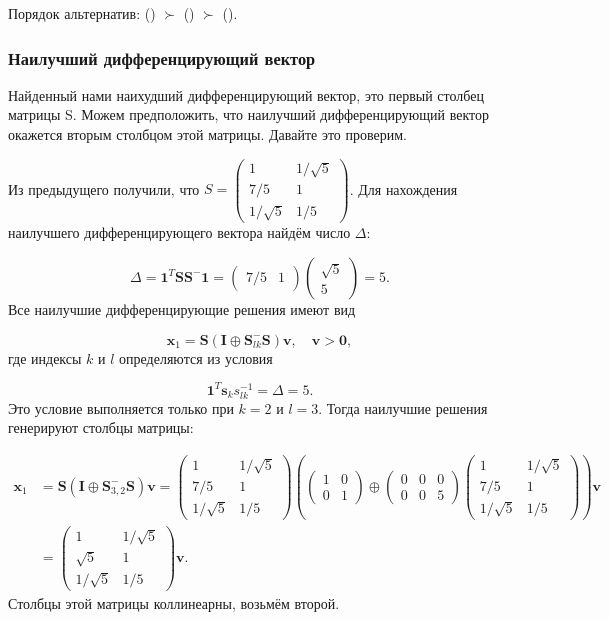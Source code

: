 \documentclass[specialist,
  substylefile = spbu.rtx,
  href,
  colorlinks=true,
  12pt]{disser}
\begin{document}
	Порядок альтернатив: () \(\succ\) () \(\succ\) ().
	\subsubsection{Наилучший дифференцирующий вектор}
	\label{sec:org896b7a9}
	Найденный нами наихудший дифференцирующий вектор, это первый столбец матрицы S. Можем предположить, что наилучший дифференцирующий вектор окажется вторым столбцом этой матрицы. Давайте это проверим.
	
	Из предыдущего получили, что \(S = \begin{pmatrix}1&1/\sqrt{5}\\7/5&1\\1/\sqrt{5}&1/5\end{pmatrix}\).
	Для нахождения наилучшего дифференцирующего вектора найдём число \(\Delta\):
	
	\[
	\Delta = \mathbf{1}^{T} \boldsymbol{S} \boldsymbol{S}^{-} \mathbf{1} = \begin{pmatrix}7/5&1\end{pmatrix}\begin{pmatrix}\sqrt{5}\\5\end{pmatrix} = 5.
	\]
	Все наилучшие дифференцирующие решения имеют вид
	
	\[
	\boldsymbol{x}_{1}=\boldsymbol{S}\left(\boldsymbol{I} \oplus \boldsymbol{S}_{l k}^{-} \boldsymbol{S}\right) \boldsymbol{v}, \quad \boldsymbol{v}>\mathbf{0},
	\]
	где индексы \(k\) и \(l\) определяются из условия
	
	\[
	\mathbf{1}^{T} \boldsymbol{s}_{k} s_{l k}^{-1}=\Delta = 5.
	\]
	Это условие выполняется только при \(k=2\) и \(l=3\). Тогда наилучшие решения генерируют столбцы матрицы:
	
	\begin{align*}
		\boldsymbol{x}_{1}&=\boldsymbol{S}\left(\boldsymbol{I} \oplus \boldsymbol{S}_{3,2}^{-} \boldsymbol{S}\right) \boldsymbol{v} = \begin{pmatrix}1&1/\sqrt{5}\\7/5&1\\1/\sqrt{5}&1/5\end{pmatrix} \left( \begin{pmatrix}1&0\\0&1\end{pmatrix} \oplus \begin{pmatrix}0&0&0\\0&0&5\end{pmatrix}\begin{pmatrix}1&1/\sqrt{5}\\7/5&1\\1/\sqrt{5}&1/5\end{pmatrix} \right)\boldsymbol{v} \\
		&= \begin{pmatrix}1&1/\sqrt{5}\\\sqrt{5}&1\\1/\sqrt{5}&1/5\end{pmatrix}\boldsymbol{v}.
	\end{align*}
	Столбцы этой матрицы коллинеарны, возьмём второй.
	
\end{document}
